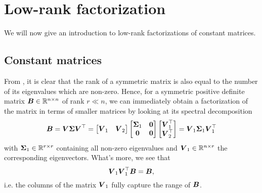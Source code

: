 
\section{Low-rank factorization}
\label{sec:3-nystrom-nystrom}

We will now give an introduction to low-rank factorizations of
constant matrices.

\subsection{Constant matrices}
\label{subsec:3-nystrom-factorization-constant-matrices}

From , it is clear that the rank of a symmetric
matrix is also equal to the number of its eigenvalues which are non-zero.
Hence, for a symmetric positive definite matrix $\boldsymbol{B} \in \mathbb{R}^{n \times n}$
of rank $r \ll n$, we can immediately obtain a factorization of the matrix in
terms of smaller matrices by looking at its spectral decomposition
\begin{equation}
    \boldsymbol{B}
        = \boldsymbol{V} \boldsymbol{\Sigma} \boldsymbol{V}^{\top} 
        = \begin{bmatrix} \boldsymbol{V}_1 & \boldsymbol{V}_2 \end{bmatrix} 
          \begin{bmatrix} \boldsymbol{\Sigma}_1 & \boldsymbol{0} \\ \boldsymbol{0} & \boldsymbol{0} \end{bmatrix} 
          \begin{bmatrix} \boldsymbol{V}_1^{\top} \\ \boldsymbol{V}_2^{\top} \end{bmatrix}
        = \boldsymbol{V}_1 \boldsymbol{\Sigma}_1 \boldsymbol{V}_1^{\top}
    \label{equ:3-nystrom-eigenvalue-decoposition}
\end{equation}
with $\boldsymbol{\Sigma}_1 \in \mathbb{R}^{r \times r}$ containing all non-zero
eigenvalues and $\boldsymbol{V}_1 \in \mathbb{R}^{n \times r}$ the corresponding
eigenvectors. What's more, we see that
\begin{equation}
    \boldsymbol{V}_1 \boldsymbol{V}_1^{\top} \boldsymbol{B} = \boldsymbol{B},
    \label{equ:3-nystrom-range-captured}
\end{equation}
i.e. the columns of the matrix $\boldsymbol{V}_1$ fully capture the range of $\boldsymbol{B}$.\\

